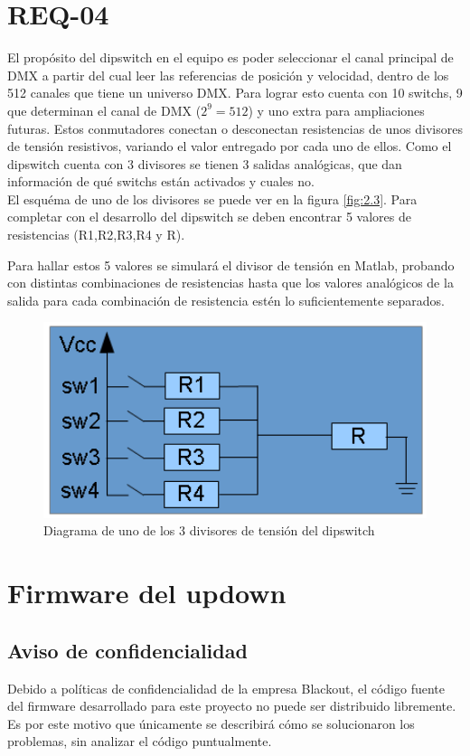 \section{REQ-04} \label{sec:\thesection}
El propósito del dipswitch en el equipo es poder seleccionar el canal principal de DMX a partir del cual leer las referencias de posición y velocidad, dentro de los 512 canales que tiene un universo DMX. Para lograr esto cuenta con 10 switchs, 9 que determinan el canal de DMX (\( 2^9 = 512 \)) y uno extra para ampliaciones futuras. Estos conmutadores conectan o desconectan resistencias de unos divisores de tensión resistivos, variando el valor entregado por cada uno de ellos. Como el dipswitch cuenta con 3 divisores se tienen 3 salidas analógicas, que dan información de qué switchs están activados y cuales no. \\
El esquéma de uno de los divisores se puede ver en la figura \ref{fig:2.3}. Para completar con el desarrollo del dipswitch se deben encontrar 5 valores de resistencias (R1,R2,R3,R4 y R).

Para hallar estos 5 valores se simulará el divisor de tensión en Matlab, probando con distintas combinaciones de resistencias hasta que los valores analógicos de la salida para cada combinación de resistencia estén lo suficientemente separados.

\begin{figure}[!ht]
	\centering
	\includegraphics[width=12cm,scale=1]{resources/2_3-dipswitch.png}
	\caption{Diagrama de uno de los 3 divisores de tensión del dipswitch}
	\label{fig:\thefigure}
\end{figure}

\section{Firmware del updown} \label{sec:\thesection}
\subsection{Aviso de confidencialidad}
Debido a políticas de confidencialidad de la empresa Blackout, el código fuente del firmware desarrollado para este proyecto no puede ser distribuido libremente. Es por este motivo que únicamente se describirá cómo se solucionaron los problemas, sin analizar el código puntualmente.

